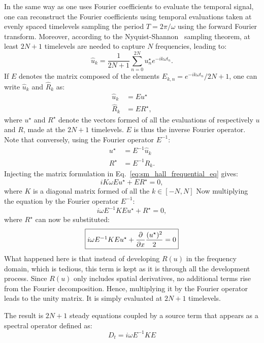 In the same way as one uses Fourier coefficients to
evaluate the temporal signal,
one can reconstruct the Fourier coefficients using
temporal evaluations taken at evenly spaced timelevels
sampling the period $T = 2 \pi / \omega$ using the forward
Fourier transform. Moreover, 
according to the Nyquist-Shannon~\cite{Shannon1949} sampling theorem, 
at least $2N+1$ timelevels are needed to capture $N$ frequencies,
leading to:
\begin{equation}
	\widehat{u}_k = \frac{1}{2N+1} 
	\sum_{n=0}^{2N} u_n^\star e^{-i k \omega t_n}.
\end{equation}
If $E$ denotes the matrix composed of the elements 
$E_{k,n} = e^{-i k \omega t_n} / 2N+1$, one can write $\widehat{u}_k$
and $\widehat{R}_k$ as:
\begin{equation}
	\begin{split}
		\widehat{u}_k &= E u^\star \\
		\widehat{R}_k &= E R^\star,
	\end{split}
\end{equation}
where $u^\star$ and $R^\star$ 
denote the vectors formed of all the evaluations of respectively $u$
and $R$,
made at the $2N+1$ timelevels. $E$ is thus the inverse Fourier operator.
Note that conversely, using the Fourier operator $E^{-1}$:
\begin{equation}
	\begin{split}
		u^\star &= E^{-1} \widehat{u}_k \\
		R^\star &= E^{-1} \widehat{R}_k.
	\end{split}
\end{equation}
Injecting the matrix formulation in Eq.~\ref{eq:sm_hall_frequential_eq}
gives:
\begin{equation}
	i K \omega E u^\star + E R^\star = 0,
\end{equation}
where $K$ is a diagonal matrix formed of all the $k \in [-N, N]$
Now multiplying the equation by the Fourier operator $E^{-1}$:
\begin{equation}
	i \omega E^{-1} K E u^\star + R^\star = 0,
\end{equation}
where $R^\star$ can now be substituted:
\begin{equation}
	\fbox{$
		i \omega E^{-1} K E u^\star + 
		\displaystyle \frac{\partial}{\partial x}
		\frac{(u^\star)^2}{2} = 0
	$}
\end{equation}
What happened here is that instead of developing $R(u)$
in the frequency domain, which is tedious, this term is kept
as it is through all the development process. 
Since $R(u)$ only includes spatial derivatives, no additional terms
rise from the Fourier decomposition. Hence, multiplying it
by the Fourier operator leads to the unity matrix. It is
simply evaluated at $2N+1$ timelevels.

The result is $2N+1$ steady equations coupled by a
source term that appears as a spectral
operator defined as:
\begin{equation}
	D_t = i \omega E^{-1} K E
\end{equation}
